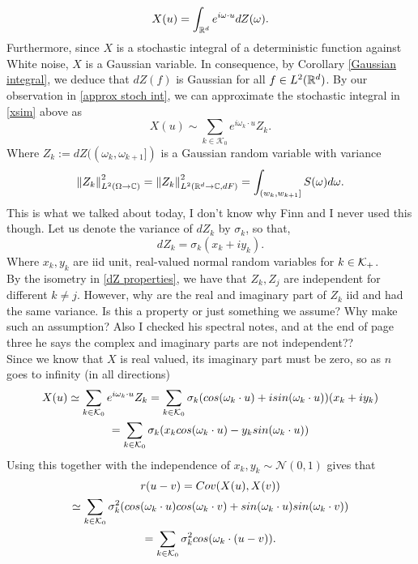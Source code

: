 \documentclass[12pt]{article}
\newcommand{\red}[1]{{\color{red}#1}}
\begin{document}
\begin{equation}\label{xsim}
    X(u)=\int_{{\mathbb R}^d}e^{i\omega\cdot u} dZ(\omega).
\end{equation}
Furthermore, since $X$ is a stochastic integral of a deterministic function against White noise,  $X$ is a Gaussian variable. In consequence, by Corollary \eqref{Gaussian integral}, we deduce that $dZ(f)$ is Gaussian for all  $f\in L^2({\mathbb R}^d)$. By our observation in \eqref{approx stoch int}, we can approximate the stochastic integral in \eqref{xsim} above as
\begin{equation*}
    X(u)\sim \sum_{k\in \mathcal{K}_0} e^{i\omega_k\cdot u}Z_k.
\end{equation*}
Where $Z_k:=dZ((\omega_k,\omega_{k+1}])$ is a Gaussian random variable with variance
\begin{equation*}
    \norm{Z_k}^2_{L^2(\Omega\to\mathbb{C})}=\norm{Z_k}^2_{L^2({\mathbb R}^d\to\mathbb{C},dF)}=\int_{(w_k,w_{k+1}]}S(\omega)d\omega.
\end{equation*}
\red{This is what we talked about today, I don't know why Finn and I never used this though.}
Let us denote the variance of $dZ_k$ by  $\sigma _k$, so that,
\begin{equation*}
    dZ_k=\sigma _k(x_k+iy_k).
\end{equation*}
Where $x_k,y_k$ are iid unit, real-valued normal random variables for $k \in \mathcal{K}_+$.
\\
\red{By the isometry in \eqref{dZ properties}, we have that $Z_k,Z_j$ are independent for different  $k\neq j$. However, why are the real and imaginary part of $Z_k$  iid and had the same variance. Is this  a property or just something we assume? Why make such an assumption? Also I checked his spectral notes, and at the end of page three he says the complex and imaginary parts are not independent??}\\
Since we know that $X$ is real valued, its imaginary part must be zero, so as $n$ goes to infinity (in all directions)
\begin{multline}\label{sr+}
    X(u)\simeq\sum_{k\in \mathcal{K}_0} e^{i\omega_k\cdot u}Z_k=\sum_{k\in \mathcal{K}_0}\sigma _k(cos(\omega_k\cdot u) + i sin(\omega_k\cdot u))(x_k +iy_k)\\
    =\sum_{k\in \mathcal{K}_0}\sigma _k(x_{k}cos(\omega_k\cdot u)-y_{k}sin(\omega_k\cdot u))
\end{multline}
Using this together with the independence of $x_k,y_k\sim\mathcal{N}(0,1)$ gives that
\begin{multline}\label{eq1}
    r(u-v)=Cov(X(u),X(v))\\\simeq \sum_{k\in \mathcal{K}_0} \sigma_k^2(cos(\omega_k\cdot u)cos(\omega_k\cdot v)+sin(\omega_k\cdot u)sin(\omega_k\cdot v))\\
    =\sum_{k\in \mathcal{K}_0} \sigma _k^2 cos(\omega_k\cdot(u-v)).
\end{multline}
\end{document}
